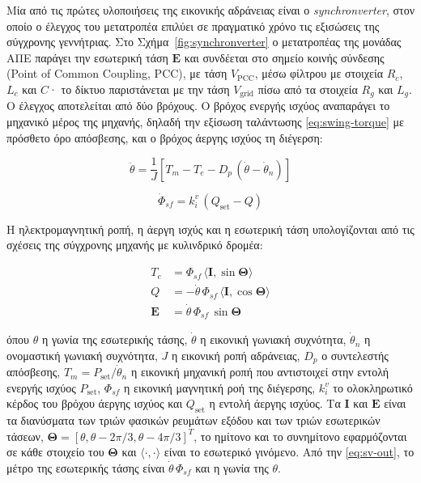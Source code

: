 Μία από τις πρώτες υλοποιήσεις της εικονικής αδράνειας είναι ο \emph{synchronverter}, στον
οποίο ο έλεγχος του μετατροπέα επιλύει σε πραγματικό χρόνο τις εξισώσεις της σύγχρονης
γεννήτριας. Στο Σχήμα~\ref{fig:synchronverter} ο μετατροπέας της μονάδας ΑΠΕ παράγει την
εσωτερική τάση $\mathbf{E}$ και συνδέεται στο σημείο κοινής σύνδεσης (Point of Common Coupling,
PCC), με τάση $V_{\mathrm{PCC}}$, μέσω φίλτρου με στοιχεία $R_c$, $L_c$ και $C$· το δίκτυο
παριστάνεται με την τάση $V_{\mathrm{grid}}$ πίσω από τα στοιχεία $R_g$ και $L_g$. Ο έλεγχος
αποτελείται από δύο βρόχους. Ο βρόχος ενεργής ισχύος αναπαράγει το μηχανικό μέρος της
μηχανής, δηλαδή την εξίσωση ταλάντωσης \eqref{eq:swing-torque} με πρόσθετο όρο απόσβεσης, και
ο βρόχος άεργης ισχύος τη διέγερση:

\begin{equation}
\ddot{\theta} = \frac{1}{J}\left[T_m - T_e - D_p\,(\dot{\theta} - \dot{\theta}_n)\right]
\label{eq:sv-swing}
\end{equation}

\begin{equation}
\dot{\Phi}_{sf} = k_i^v\,(Q_{\mathrm{set}} - Q)
\label{eq:sv-flux}
\end{equation}

Η ηλεκτρομαγνητική ροπή, η άεργη ισχύς και η εσωτερική τάση υπολογίζονται από τις σχέσεις της
σύγχρονης μηχανής με κυλινδρικό δρομέα:

\begin{align}
T_e &= \Phi_{sf}\,\langle \mathbf{I}, \sin\boldsymbol{\Theta} \rangle \\
Q &= -\dot{\theta}\,\Phi_{sf}\,\langle \mathbf{I}, \cos\boldsymbol{\Theta} \rangle \\
\mathbf{E} &= \dot{\theta}\,\Phi_{sf}\,\sin\boldsymbol{\Theta}
\label{eq:sv-out}
\end{align}

όπου $\theta$ η γωνία της εσωτερικής τάσης, $\dot{\theta}$ η εικονική γωνιακή συχνότητα,
$\dot{\theta}_n$ η ονομαστική γωνιακή συχνότητα, $J$ η εικονική ροπή αδράνειας, $D_p$ ο
συντελεστής απόσβεσης, $T_m = P_{\mathrm{set}}/\dot{\theta}_n$ η εικονική μηχανική ροπή που
αντιστοιχεί στην εντολή ενεργής ισχύος $P_{\mathrm{set}}$, $\Phi_{sf}$ η εικονική μαγνητική
ροή της διέγερσης, $k_i^v$ το ολοκληρωτικό κέρδος του βρόχου άεργης ισχύος και
$Q_{\mathrm{set}}$ η εντολή άεργης ισχύος. Τα $\mathbf{I}$ και $\mathbf{E}$ είναι τα διανύσματα
των τριών φασικών ρευμάτων εξόδου και των τριών εσωτερικών τάσεων,
$\boldsymbol{\Theta} = [\theta, \theta - 2\pi/3, \theta - 4\pi/3]^{T}$, το ημίτονο και το
συνημίτονο εφαρμόζονται σε κάθε στοιχείο του $\boldsymbol{\Theta}$ και
$\langle \cdot, \cdot \rangle$ είναι το εσωτερικό γινόμενο. Από την \eqref{eq:sv-out}, το μέτρο
της εσωτερικής τάσης είναι $\dot{\theta}\,\Phi_{sf}$ και η γωνία της $\theta$.

